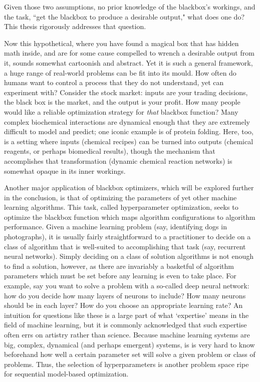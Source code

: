 Given those two assumptions, no prior knowledge of the blackbox's workings, and the task, ``get the blackbox to produce a desirable output," what does one do? This thesis rigorously addresses that question.

Now this hypothetical, where you have found a magical box that has hidden math inside, and are for some cause compelled to wrench a desirable output from it, sounds somewhat cartoonish and abstract. Yet it is such a general framework, a huge range of real-world problems can be fit into its mould. How often do humans want to control a process that they do not understand, yet can experiment with? Consider the stock market: inputs are your trading decisions, the black box is the market, and the output is your profit. How many people would like a reliable optimization strategy for \emph{that} blackbox function? Many complex biochemical interactions are dynamical enough that they are extremely difficult to model and predict; one iconic example is of protein folding. Here, too, is a setting where inputs (chemical recipes) can be turned into outputs (chemical reagents, or perhaps biomedical results), though the mechanism that accomplishes that transformation (dynamic chemical reaction networks) is somewhat opaque in its inner workings. 

Another major application of blackbox optimizers, which will be explored further in the conclusion, is that of optimizing the parameters of yet other machine learning algorithms. This task, called hyperparameter optimization, seeks to optimize the blackbox function which maps algorithm configurations to algorithm performance. Given a machine learning problem (say, identifying dogs in photographs), it is usually fairly straightforward to a practitioner to decide on a class of algorithm that is well-suited to accomplishing that task (say, recurrent neural networks). Simply deciding on a class of solution algorithms is not enough to find a solution, however, as there are invariably a basketful of algorithm parameters which must be set before any learning is even to take place. For example, say you want to solve a problem with a so-called deep neural network: how do you decide how many layers of neurons to include? How many neurons should be in each layer? How do you choose an appropriate learning rate? An intuition for questions like these is a large part of what `expertise' means in the field of machine learning, but it is commonly acknowledged that such expertise often errs on artistry rather than science. Because machine learning systems are big, complex, dynamical (and perhaps emergent) systems, is is very hard to know beforehand how well a certain parameter set will solve a given problem or class of problems. Thus, the selection of hyperparameters is another problem space ripe for sequential model-based optimization.

